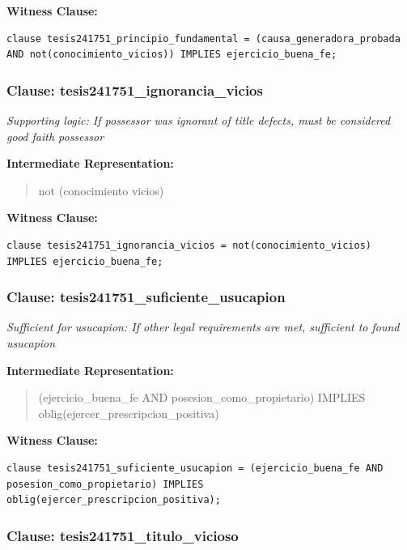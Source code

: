 \documentclass[11pt,a4paper]{article}
\begin{document}
\textbf{Witness Clause:}

\begin{lstlisting}[style=witnessstyle, language=Witness]
clause tesis241751_principio_fundamental = (causa_generadora_probada AND not(conocimiento_vicios)) IMPLIES ejercicio_buena_fe;
\end{lstlisting}

\subsubsection{Clause: tesis241751\_ignorancia\_vicios}

\textit{Supporting logic: If possessor was ignorant of title defects, must be considered good faith possessor}

\textbf{Intermediate Representation:}

\begin{quote}
not (conocimiento vicios)
\end{quote}

\textbf{Witness Clause:}

\begin{lstlisting}[style=witnessstyle, language=Witness]
clause tesis241751_ignorancia_vicios = not(conocimiento_vicios) IMPLIES ejercicio_buena_fe;
\end{lstlisting}

\subsubsection{Clause: tesis241751\_suficiente\_usucapion}

\textit{Sufficient for usucapion: If other legal requirements are met, sufficient to found usucapion}

\textbf{Intermediate Representation:}

\begin{quote}
(ejercicio\_buena\_fe AND posesion\_como\_propietario) IMPLIES oblig(ejercer\_prescripcion\_positiva)
\end{quote}

\textbf{Witness Clause:}

\begin{lstlisting}[style=witnessstyle, language=Witness]
clause tesis241751_suficiente_usucapion = (ejercicio_buena_fe AND posesion_como_propietario) IMPLIES oblig(ejercer_prescripcion_positiva);
\end{lstlisting}

\subsubsection{Clause: tesis241751\_titulo\_vicioso}
\end{document}

